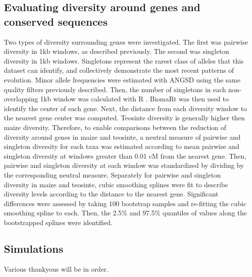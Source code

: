 \documentclass{pnastwo}
\begin{document}
\begin{article}
\begin{materials}
\subsection{Evaluating diversity around genes and conserved sequences}
Two types of diversity surrounding genes were investigated. The first
was pairwise diversity in 1kb windows, as described previously. The
second was singleton diversity in 1kb windows. Singletons represent
the rarest class of alleles that this dataset can identify, and
collectively demonstrate the most recent patterns of evolution. Minor
allele frequencies were estimated with ANGSD \cite{korneliussen2014} using the
same quality filters previously described. Then, the number of
singletons in each non-overlapping 1kb window was calculated with R
\cite{R2014}. BiomaRt \cite{durinck2009, durinck2005} was then used to identify
the center of each gene. Next, the distance from each diversity window
to the nearest gene center was computed. Teosinte diversity is
generally higher then maize diversity. Therefore, to enable comparisons between
the reduction of diversity around genes in maize and teosinte, a
neutral measure of pairwise and singleton diversity for each taxa was estimated according to
mean pairwise and singleton diversity at windows greater than 0.01 cM from the nearest
gene. Then, pairwise and singleton diversity at each window was
standardized by dividing by the corresponding neutral
measure. Separately for pairwise and singleton diversity in maize and
teosinte, cubic smoothing splines were fit to
describe diversity levels according to the distance to the nearest
gene. Significant differences were assessed by taking 100 bootstrap
samples and re-fitting the cubic smoothing spline to each. Then, the
2.5\% and 97.5\% quantiles of values along the bootstrapped splines
were identified.

\subsection{Simulations}

\end{materials}

\begin{acknowledgments}
Various thankyous will be in order.
\end{acknowledgments}




\end{article}
\end{document}
